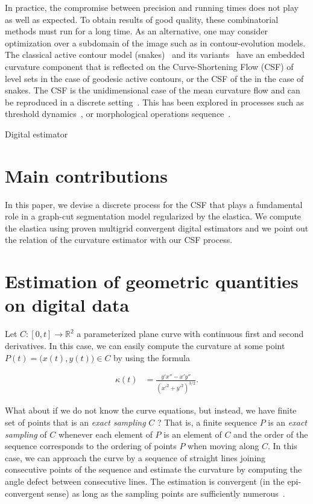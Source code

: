 \documentclass[review]{siamart220329}
\begin{document}
In practice, the compromise between precision and running times does
not play as well as expected. To obtain results of good quality, these
combinatorial methods must run for a long time. As an alternative, one
may consider optimization over a subdomain of the image such as in
contour-evolution models. The classical active contour model
(snakes)~\cite{kass1988snakes} and its
variants~\cite{caseles97geodesic,chan01} have an embedded curvature
component that is reflected on the Curve-Shortening Flow (CSF) of
level sets in the case of geodesic active contours, or the CSF of the
 in the case of snakes. The CSF is the
unidimensional case of the mean curvature flow and can be reproduced
in a discrete setting~\cite{merriman1992diffusion}. This has been
explored in processes such as threshold
dynamics~\cite{esedoglu2005threshold,esedoglu2008threshold}, or
morphological operations sequence~\cite{marquezneila14}.

Digital estimator 
%
%
%
%
\section{Main contributions}
In this paper, we devise a discrete process for the CSF that plays a fundamental
role in a graph-cut segmentation model regularized by the elastica. We compute the
elastica using proven multigrid convergent digital estimators and we point out
the relation of the curvature estimator with our CSF process.
%
%
%
%
\section{Estimation of geometric quantities on digital data}

Let $C:[0,t] \rightarrow \mathbb{R}^2$ a parameterized plane curve with continuous first and second derivatives. In this case, we can easily compute the curvature at some point $P(t) = \big( x(t),y(t) \big) \in C$ by using the formula

\begin{align*}
\kappa (t) &= \frac{y'x'' -x'y''}{(x'^2 + y'^2)^{3/2}}.
\end{align*}

What about if we do not know the curve equations, but instead, we have finite set of points that is an \emph{exact sampling} $C$ ? That is, a finite sequence $P$ is an {\em exact sampling} of $C$ whenever each element of $P$ is an element of $C$ and the order of the sequence corresponds to the ordering of points $P$ when moving along $C$. In this case, we can approach the curve by a sequence of straight lines joining consecutive points of the sequence and estimate the curvature by computing the angle defect between consecutive lines. The estimation is convergent (in the epi-convergent sense) as long as the sampling points are sufficiently numerous~\cite{bruckstein01discrete,bruckstein01convergence}.
\end{document}
